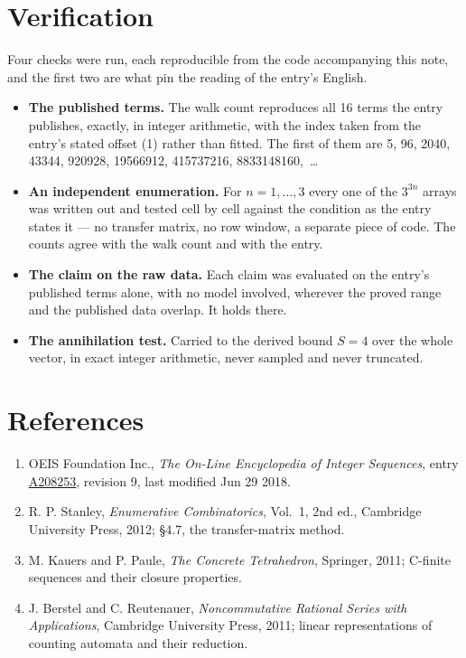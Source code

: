 \documentclass[11pt]{article}
\theoremstyle{definition}
\begin{document}
\section{Verification}

Four checks were run, each reproducible from the code accompanying this note, and the first two are what pin the reading of the entry's English.

\begin{itemize}

\item {\bfseries The published terms.} The walk count reproduces all 16 terms the entry publishes, exactly, in integer arithmetic, with the index taken from the entry's stated offset (1) rather than fitted. The first of them are 5, 96, 2040, 43344, 920928, 19566912, 415737216, 8833148160,~\dots

\item {\bfseries An independent enumeration.} For $n = 1,\dots,3$ every one of the $3^{3n}$ arrays was written out and tested cell by cell against the condition as the entry states it --- no transfer matrix, no row window, a separate piece of code. The counts agree with the walk count and with the entry.

\item {\bfseries The claim on the raw data.} Each claim was evaluated on the entry's published terms alone, with no model involved, wherever the proved range and the published data overlap. It holds there.

\item {\bfseries The annihilation test.} Carried to the derived bound $S = 4$ over the whole vector, in exact integer arithmetic, never sampled and never truncated.

\end{itemize}

\section{References}

\begin{enumerate}

\item OEIS Foundation Inc., \emph{The On-Line Encyclopedia of Integer Sequences}, entry \href{https://oeis.org/A208253}{A208253}, revision 9, last modified Jun 29 2018.

\item R. P. Stanley, \emph{Enumerative Combinatorics}, Vol.~1, 2nd ed., Cambridge University Press, 2012; \S4.7, the transfer-matrix method.

\item M. Kauers and P. Paule, \emph{The Concrete Tetrahedron}, Springer, 2011; C-finite sequences and their closure properties.

\item J. Berstel and C. Reutenauer, \emph{Noncommutative Rational Series with Applications}, Cambridge University Press, 2011; linear representations of counting automata and their reduction.

\end{enumerate}
\end{document}
